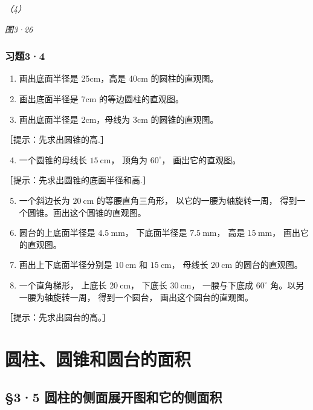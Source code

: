 \emph{（4）}

\emph{图3·26}

\subsubsection{习题3·4}

\begin{enumerate}
\item
  画出底面半径是 25cm，高是 40cm 的圆柱的直观图。
\item
  画出底面半径是 7cm 的等边圆柱的直观图。
\item
  画出底面半径是 2cm，母线为 3cm 的圆锥的直观图。
\end{enumerate}

［提示：先求出圆锥的高.］

\begin{enumerate}
\setcounter{enumi}{3}
\item
  一个圆锥的母线长 \(15 \mathrm{~cm}\)， 顶角为 \(60^{\circ}\)，
  画出它的直观图。
\end{enumerate}

［提示：先求出圆锥的底面半径和高.］

\begin{enumerate}
\setcounter{enumi}{4}
\item
  一个斜边长为 \(20 \mathrm{~cm}\) 的等腰直角三角形，
  以它的一腰为轴旋转一周， 得到一个圆锥。画出这个圆锥的直观图。
\item
  圆台的上底面半径是 \(4.5 \mathrm{~mm}\)， 下底面半径是
  \(7.5 \mathrm{~mm}\)， 高是 \(15 \mathrm{~mm}\)， 画出它的直观图。
\item
  画出上下底面半径分别是 \(10 \mathrm{~cm}\) 和 \(15 \mathrm{~cm}\)，
  母线长 \(20 \mathrm{~cm}\) 的圆台的直观图。
\item
  一个直角梯形， 上底长 \(20 \mathrm{~cm}\)， 下底长
  \(30 \mathrm{~cm}\)， 一腰与下底成 \(60^{\circ}\)
  角。以另一腰为轴旋转一周， 得到一个圆台， 画出这个圆台的直观图。
\end{enumerate}

［提示：先求出圆台的高。］

\section{圆柱、圆锥和圆台的面积}

\subsection{§3·5
圆柱的侧面展开图和它的侧面积}

